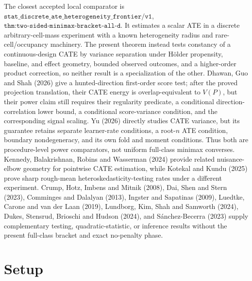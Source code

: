 \documentclass{article}
\begin{document}
The closest accepted local comparator is \(\texttt{stat\_discrete\_ate\_heterogeneity\_frontier/v1}\), \(\texttt{thm:two-sided-minimax-bracket-all-d}\). It estimates a scalar ATE in a discrete arbitrary-cell-mass experiment with a known heterogeneity radius and rare-cell/occupancy machinery. The present theorem instead tests constancy of a continuous-design CATE by variance separation under Hölder propensity, baseline, and effect geometry, bounded observed outcomes, and a higher-order product correction, so neither result is a specialization of the other. Dhawan, Guo and Shah (2026) give a hunted-direction first-order score test; after the proved projection translation, their CATE energy is overlap-equivalent to \(V(P)\), but their power claim still requires their regularity predicate, a conditional direction-correlation lower bound, a conditional score-variance condition, and the corresponding signal scaling. Yu (2026) directly studies CATE variance, but its guarantee retains separate learner-rate conditions, a root-\(n\) ATE condition, boundary nondegeneracy, and its own fold and moment conditions. Thus both are procedure-level power comparators, not uniform full-class minimax converses. Kennedy, Balakrishnan, Robins and Wasserman (2024) provide related nuisance-elbow geometry for pointwise CATE estimation, while Kotekal and Kundu (2025) prove sharp rough-mean heteroskedasticity-testing rates under a different experiment. Crump, Hotz, Imbens and Mitnik (2008), Dai, Shen and Stern (2023), Comminges and Dalalyan (2013), Ingster and Sapatinas (2009), Luedtke, Carone and van der Laan (2019), Lundborg, Kim, Shah and Samworth (2024), Dukes, Stensrud, Brioschi and Hudson (2024), and Sánchez-Becerra (2023) supply complementary testing, quadratic-statistic, or inference results without the present full-class bracket and exact no-penalty phase.

\section{Setup}
\end{document}
